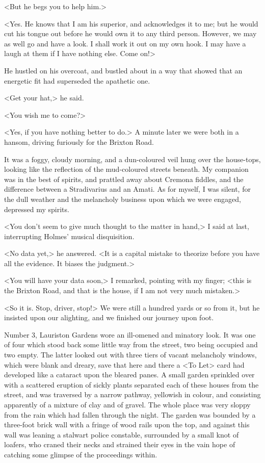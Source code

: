 <But he begs you to help him.>

<Yes. He knows that I am his superior, and acknowledges it to me; but he would cut his tongue out before he would own it to any third person. However, we may as well go and have a look. I shall work it out on my own hook. I may have a laugh at them if I have nothing else. Come on!>

He hustled on his overcoat, and bustled about in a way that showed that an energetic fit had superseded the apathetic one.

<Get your hat,> he said.

<You wish me to come?>

<Yes, if you have nothing better to do.> A minute later we were both in a hansom, driving furiously for the Brixton Road.

It was a foggy, cloudy morning, and a dun-coloured veil hung over the house-tops, looking like the reflection of the mud-coloured streets beneath. My companion was in the best of spirits, and prattled away about Cremona fiddles, and the difference between a Stradivarius and an Amati. As for myself, I was silent, for the dull weather and the melancholy business upon which we were engaged, depressed my spirits.

<You don't seem to give much thought to the matter in hand,> I said at last, interrupting Holmes' musical disquisition.

<No data yet,> he answered. <It is a capital mistake to theorize before you have all the evidence. It biases the judgment.>

<You will have your data soon,> I remarked, pointing with my finger; <this is the Brixton Road, and that is the house, if I am not very much mistaken.>

<So it is. Stop, driver, stop!> We were still a hundred yards or so from it, but he insisted upon our alighting, and we finished our journey upon foot.

Number 3, Lauriston Gardens wore an ill-omened and minatory look. It was one of four which stood back some little way from the street, two being occupied and two empty. The latter looked out with three tiers of vacant melancholy windows, which were blank and dreary, save that here and there a <To Let> card had developed like a cataract upon the bleared panes. A small garden sprinkled over with a scattered eruption of sickly plants separated each of these houses from the street, and was traversed by a narrow pathway, yellowish in colour, and consisting apparently of a mixture of clay and of gravel. The whole place was very sloppy from the rain which had fallen through the night. The garden was bounded by a three-foot brick wall with a fringe of wood rails upon the top, and against this wall was leaning a stalwart police constable, surrounded by a small knot of loafers, who craned their necks and strained their eyes in the vain hope of catching some glimpse of the proceedings within.

